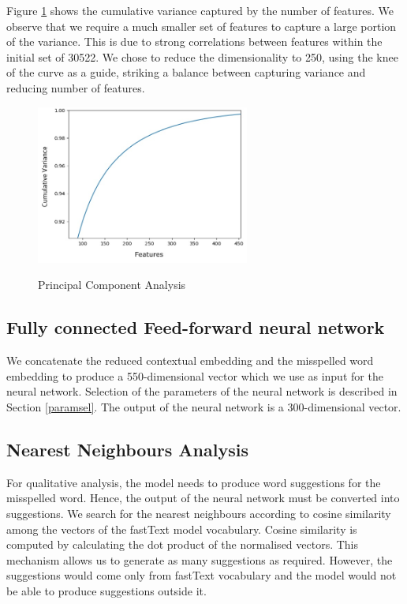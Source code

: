 \documentclass[11pt,a4paper]{article}
\begin{document}
Figure \ref{img:pca} shows the cumulative variance captured by the number of features. We observe that we require a much smaller set of features to capture a large portion of the variance. This is due to strong correlations between features within the initial set of 30522. We chose to reduce the dimensionality to 250, using the knee of the curve as a guide, striking a balance between capturing variance and reducing number of features.

\begin{figure}[H]
\caption{Principal Component Analysis}
\centering
\includegraphics[width=7cm]{PCA.jpg}
\label{img:pca}
\end{figure}

\subsection{Fully connected Feed-forward neural network}
\label{ffnn}
We concatenate the reduced contextual embedding and the misspelled word embedding to produce a 550-dimensional vector which we use as input for the neural network. Selection of the parameters of the neural network is described in Section \ref{paramsel}. The output of the neural network is a 300-dimensional vector.

\subsection{Nearest Neighbours Analysis}
\label{output}
For qualitative analysis, the model needs to produce word suggestions for the misspelled word. Hence, the output of the neural network must be converted into suggestions. We search for the nearest neighbours according to cosine similarity among the vectors of the fastText model vocabulary. Cosine similarity is computed by calculating the dot product of the normalised vectors. This mechanism allows us to generate as many suggestions as required. However, the suggestions would come only from fastText vocabulary and the model would not be able to produce suggestions outside it.
\end{document}

